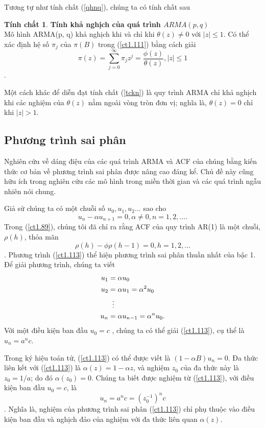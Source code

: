 \documentclass[12pt, a4paper,oneside]{book}
\theoremstyle{definition}
\newtheorem{tc}[theo]{Tính chất}
\begin{document}
Tương tự như tính chất (\ref{qhnq}), chúng ta có tính chất sau 
\begin{tc}\textbf{\label{tckn}Tính khả nghịch của quá trình $ARMA(p, q)$}\\
 Mô hình ARMA(p, q) khả nghịch khi và chỉ khi $\theta(z) \neq0$ với $| z | \leq1$. Có thể xác định hệ số $\pi_{j}$ của $\pi(B)$ trong (\ref{ct1.111}) bằng cách giải 
$$\pi(z)= \sum_{j=0}^{\infty}\pi_{j}z^{j} = \dfrac{\phi(z)}{\theta(z)}, |z|\leq1$$.
\end{tc}

Một cách khác để diễn đạt tính chất (\ref{tckn}) là quy trình ARMA chỉ khả nghịch khi các nghiệm của $\theta(z)$ nằm ngoài vòng tròn đơn vị; nghĩa là, $\theta(z) = 0$ chỉ khi $| z | > 1$.

\subsection{Phương trình sai phân}
Nghiên cứu về dáng điệu của các quá trình ARMA và ACF của chúng bằng kiến thức cơ bản về phương trình sai phân được nâng cao đáng kể. Chủ đề này cũng hữu ích trong nghiên cứu các mô hình trong miền thời gian và các quá trình ngẫu nhiên nói chung.

Giả sử chúng ta có một chuỗi số $u_{0},u_{1},u_{2}...$ sao cho
\begin{equation}
u_{n} - \alpha  u_{n+1} =0  ,      \alpha \neq 0      , n=1,2,... . \label{ct1.113}
\end{equation}
Trong (\ref{ct1.89}), chúng tôi đã chỉ ra rằng ACF của quy trình AR(1) là một chuỗi, $\rho(h)$, thỏa mãn
$$\rho(h)-\phi\rho(h-1)= 0, h=1,2,...$$.
Phương trình (\ref{ct1.113}) thể hiện phương trình sai phân thuần nhất của bậc 1. Để giải phương trình, chúng ta viết
\begin{align*}
u_{1}&= \alpha u_{0}\\
u_{2}&=\alpha u_{1}= \alpha^{2} u_{0}\\
& \hspace{0.2cm}\vdots\\
u_{n}&=\alpha u_{n-1} =\alpha^{n} u_{0}.	
\end{align*}
Với một điều kiện ban đầu $u_{0}=c$  , chúng ta có thể giải (\ref{ct1.113}), cụ thể là $u_{n}=a^{n}c$.

Trong ký hiệu toán tử, (\ref{ct1.113}) có thể được viết là $(1-\alpha B) u_{n}=0$. Đa thức liên kết với (\ref{ct1.113}) là $\alpha (z) =1-\alpha z$, và nghiệm $z_{0}$ của đa thức này là $z_{0}= 1/a$; do đó $\alpha (z_{0}) =0$. Chúng ta biết được nghiệm từ (\ref{ct1.113}), với điều kiện ban đầu $u_{0}=c$, là
$$u_{n}=a^{n}c=(z_{0}^{-1})^{n}c$$.
Nghĩa là, nghiệm của phương trình sai phân (\ref{ct1.113}) chỉ phụ thuộc vào điều kiện ban đầu và nghịch đảo của nghiệm với đa thức liên quan $\alpha(z)$.
\end{document}
